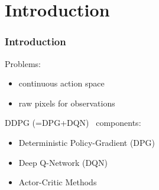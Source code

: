 \section{Introduction}

\begin{frame}
\frametitle{Introduction}
Problems:
\begin{itemize}
  \item continuous action space
  \item raw pixels for observations
\end{itemize}

DDPG (=DPG+DQN)~\cite{Lillicrap2015} components:
\begin{itemize}
  \item Deterministic Policy-Gradient (DPG) \cite{Silver2014}
  \item Deep Q-Network (DQN) \cite{Mnih2013}
  \item Actor-Critic Methods \cite{Sutton1998}
\end{itemize}



\end{frame}
